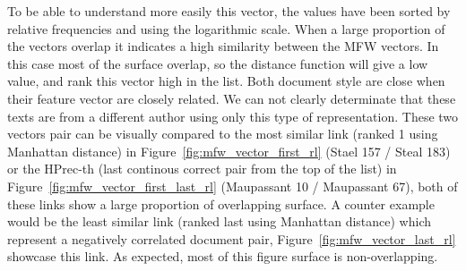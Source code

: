 To be able to understand more easily this vector, the values have been sorted by relative frequencies and using the logarithmic scale.
When a large proportion of the vectors overlap it indicates a high similarity between the MFW vectors.
In this case most of the surface overlap, so the distance function will give a low value, and rank this vector high in the list.
Both document style are close when their feature vector are closely related.
We can not clearly determinate that these texts are from a different author using only this type of representation.
These two vectors pair can be visually compared to the most similar link (ranked 1 using Manhattan distance) in Figure~\ref{fig:mfw_vector_first_rl} (Stael 157 / Steal 183) or the HPrec-th (last continous correct pair from the top of the list) in Figure~\ref{fig:mfw_vector_first_last_rl} (Maupassant 10 / Maupassant 67), both of these links show a large proportion of overlapping surface.
A counter example would be the least similar link (ranked last using Manhattan distance) which represent a negatively correlated document pair, Figure~\ref{fig:mfw_vector_last_rl} showcase this link.
As expected, most of this figure surface is non-overlapping.

